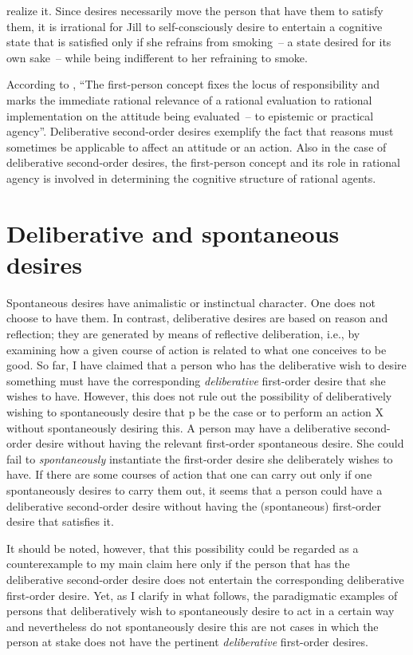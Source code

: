 \documentclass[output=paper]{langscibook}
\begin{document}
realize it. Since desires necessarily move the person that have them to satisfy them, it is irrational for Jill to self-consciously desire to entertain a cognitive state that is satisfied only if she refrains from smoking~– a state desired for its own sake~– while being indifferent to her refraining to smoke.

According to \citet[253]{burge1998reason}, ``The first-person concept fixes the locus of responsibility and marks the immediate rational relevance of a rational evaluation to rational implementation on the attitude being evaluated~– to epistemic or practical agency''. Deliberative second-order desires exemplify the fact that reasons must sometimes be applicable to affect an attitude or an action. Also in the case of deliberative second-order desires, the first-person concept and its role in rational agency is involved in determining the cognitive structure of rational agents.   




\section{Deliberative and spontaneous desires}
\begin{sloppypar}
Spontaneous desires have animalistic or instinctual character. One does not choose to have them. In contrast, deliberative desires are based on reason and reflection; they are generated by means of reflective deliberation, i.e., by examining how a given course of action is related to what one conceives to be good. So far, I have claimed that a person who has the deliberative wish to desire something must have the corresponding \textit{deliberative} first-order desire that she wishes to have. However, this does not rule out the possibility of deliberatively wishing to spontaneously desire that p be the case or to perform an action X without spontaneously desiring this. A person may have a deliberative second-order desire without having the relevant first-order spontaneous desire. She could fail to \textit{spontaneously} instantiate the first-order desire she deliberately wishes to have. If there are some courses of action that one can carry out only if one spontaneously desires to carry them out, it seems that a person could have a deliberative second-order desire without having the (spontaneous) first-order desire that satisfies it.
\end{sloppypar}

It should be noted, however, that this possibility could be regarded as a counterexample to my main claim here only if the person that has the deliberative second-order desire does not entertain the corresponding deliberative first-order desire. Yet, as I clarify in what follows, the paradigmatic examples of persons that deliberatively wish to spontaneously desire to act in a certain way and nevertheless do not spontaneously desire this are not cases in which the person at stake does not have the pertinent \textit{deliberative} first-order desires. 
\end{document}
